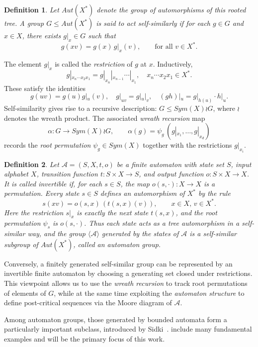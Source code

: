 \documentclass{article}
\newtheorem{mydef}{Definition}[section]
\newcommand{\A}{\mathcal{A}}
\begin{document}
\begin{mydef}\label{def:self-similar-gr} Let $Aut(X^*)$ denote the group of automorphisms of this rooted tree. A group $G \leq Aut(X^*)$ is said to act self-similarly if for each $g \in G$ and $x \in X$, there exists $g|_x \in G$ such that
$$g(xv) = g(x)\, g|_x(v), \qquad \text{for all } v \in X^*.$$  
\end{mydef}
The element $g|_x$ is called the \emph{restriction} of $g$ at $x$. Inductively,
$$g|_{x_n \cdots x_2 x_1}= g|_{x_n}|_{x_{n-1}} \cdots |_{x_1}, \quad x_n \cdots x_2 x_1 \in X^*.$$
These satisfy the identities
\begin{equation}
g(uv) = g(u)g|_u(v), \quad g|_{uv} = g|_u|_v, \quad (gh)|_u = g|_{h(u)}\cdot h|_u. \label{eqn:restriction_g}
\end{equation}
Self-similarity gives rise to a recursive description: $G \leq Sym(X)\wr G$, where $\wr$ denotes the wreath product. The associated \emph{wreath recursion} map
$$\alpha: G \to Sym(X)\wr G, \qquad \alpha(g) = \psi_g \,(g|_{x_1},\dots,g|_{x_d})$$
records the \emph{root permutation} $\psi_g \in Sym(X)$ together with the restrictions $g|_{x_i}$.

\begin{mydef}\label{def:aut_gr}
  Let $\A=(S,X,t,o)$ be a finite automaton with state set $S$, input alphabet $X$, transition function $t:S\times X\to S$, and output function $o:S\times X\to X$. It is called \emph{invertible} if, for each $s\in S$, the map $o(s,\cdot):X\to X$ is a permutation. Every state $s\in S$ defines an automorphism of $X^*$ by the rule
$$s(xv) = o(s,x)\, (t(s,x)(v)), \qquad x\in X,\, v\in X^*.$$ Here the restriction $s|_x$ is exactly the next state $t(s,x)$, and the root permutation $\psi_s$ is $o(s,\cdot)$. Thus each state acts as a tree automorphism in a self-similar way, and the group $\langle \A \rangle$ generated by the states of $\A$ is a self-similar subgroup of $Aut(X^*)$, called an automaton group.
\end{mydef}
Conversely, a finitely generated self-similar group can be represented by an invertible finite automaton by choosing a generating set closed under restrictions. This viewpoint allows us to use the \emph{wreath recursion} to track root permutations of elements of $G$, while at the same time exploiting the \emph{automaton structure} to define post-critical sequences via the Moore diagram of $\A$.

Among automaton groups, those generated by bounded automata form a particularly important subclass, introduced by Sidki~\cite{sidki2000automorphisms}. include many fundamental examples and will be the primary focus of this work.
\end{document}
